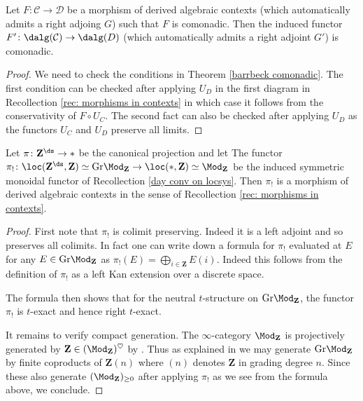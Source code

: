 \documentclass[10pt,reqno]{amsart}
\numberwithin{equation}{section}
\newcommand{\cD}{{\mathcal{D}}}
\newcommand{\cC}{\mathcal{C}}
\newcommand{\ZZ}{\mathbf{Z}}
\newcommand{\Gr}{\mathrm{Gr}}
\begin{document}
\begin{lemma}\label{monadicity in dalg}
    Let $F\colon \cC\to \cD$ be a morphism of derived algebraic contexts (which automatically admits a right adjoing $G$) such that $F$ is comonadic. Then the induced functor $F'\colon \dalg(\cC)\to \dalg(D)$ (which automatically admits a right adjoint $G'$) is comonadic.
\end{lemma}
\begin{proof}
    We need to check the conditions in Theorem \ref{barrbeck comonadic}. The first condition can be checked after applying $U_D$ in the first diagram in Recollection \ref{rec: morphisms in contexts} in which case it follows from the conservativity of $F\circ U_C$. 
    The second fact can also be checked after applying $U_D$ as the functors $U_C$ and $U_D$ preserve all limits.
\end{proof}

  
\begin{proposition}\label{pi! is a morphism of contexts}
Let $\pi\colon \ZZ^\ds\to {*}$ be the canonical projection and let
The functor $\pi_!\colon \loc(\ZZ^\ds,\ZZ)\simeq \Gr\Mod_\ZZ\to \loc({*}, \ZZ)\simeq \Mod_\ZZ$ be the induced symmetric monoidal functor of Recollection \ref{day conv on locsys}. Then $\pi_!$ is a morphism of derived algebraic contexts in the sense of Recollection \ref{rec: morphisms in contexts}.
\end{proposition}


\begin{proof}
    First note that $\pi_!$ is colimit preserving. Indeed it is a left adjoint and so preserves all colimits. In fact one can write down a formula for $\pi_!$ evaluated at $E$ for any $E\in \Gr\Mod_\ZZ$ as $\pi_!(E)=\bigoplus_{i\in \ZZ}E(i).$ Indeed this follows from the definition of $\pi_!$ as a left Kan extension over a discrete space.

    The formula then shows that for the neutral $t$-structure on $\Gr\Mod_\ZZ$, the functor $\pi_!$ is $t$-exact and hence right $t$-exact. 

    It remains to verify compact generation. The $\infty$-category $\Mod_\ZZ$ is projectively generated by $\ZZ\in (\Mod_\ZZ)^\heartsuit$ by \cite[Corollary 7.1.4.15.]{HA}. Thus as explained in \cite[Construction 4.3.4]{Rak20} we may generate $\Gr\Mod_\ZZ$ by finite coproducts of $\ZZ(n)$ where $(n)$ denotes $\ZZ$ in grading degree $n.$ Since these also generate $(\Mod_\ZZ)_{\geq0}$ after applying $\pi_!$ as we see from the formula above, we conclude.
\end{proof}
\end{document}
